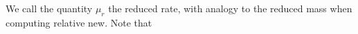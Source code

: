 We call the quantity \(\mu_r\) the reduced rate, with analogy to the reduced mass when computing relative new.  Note that